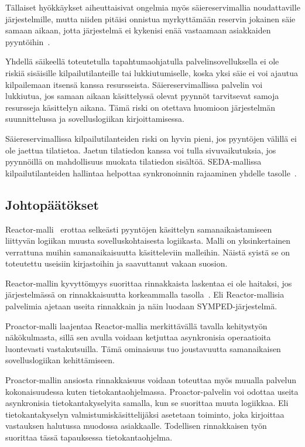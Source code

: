 \documentclass[finnish]{tktltiki2}%
\theoremstyle{definition}
\theoremstyle{remark}
\begin{document}
Tällaiset hyökkäykset aiheuttaisivat ongelmia myös säiereservimallia
noudattaville järjestelmille, mutta niiden pitäisi onnistua
myrkyttämään reservin jokainen säie samaan aikaan, jotta
järjestelmä ei kykenisi enää vastaamaan asiakkaiden pyyntöihin~\cite{davis_case_2017}.

Yhdellä säikeellä toteutetulla tapahtumaohjatulla palvelinsovelluksella ei ole
riskiä sisäisille kilpailutilanteille tai lukkiutumiselle, koska
yksi säie ei voi ajautua kilpailemaan itsensä kanssa resursseista.
Säiereservimallissa palvelin voi lukkiutua, jos samaan aikaan käsittelyssä olevat
pyynnöt tarvitsevat samoja resursseja käsittelyn aikana. Tämä riski on otettava
huomioon järjestelmän suunnittelussa ja sovelluslogiikan kirjoittamisessa.

Säiereservimallissa kilpailutilanteiden riski on hyvin pieni, jos pyyntöjen
välillä ei ole jaettua tilatietoa. Jaetun tilatiedon kanssa voi tulla
sivuvaikutuksia, jos pyynnöillä on mahdollisuus muokata tilatiedon sisältöä.
SEDA-mallissa kilpailutilanteiden hallintaa helpottaa synkronoinnin
rajaaminen yhdelle tasolle~\cite{welsh_seda_2001}.

\subsection{Johtopäätökset}
Reactor-malli~\cite{schmidt_reactor:_1995} erottaa
selkeästi pyyntöjen käsittelyn
samanaikaistamiseen liittyvän
logiikan muusta sovelluskohtaisesta logiikasta.
Malli on yksinkertainen verrattuna muihin samanaikaisuutta
käsitteleviin malleihin.
Näistä syistä se on toteutettu useisiin
kirjastoihin ja saavuttanut vakaan suosion.

Reactor-mallin kyvyttömyys suorittaa rinnakkaista laskentaa 
ei ole haitaksi, jos järjestelmässä on rinnakkaisuutta
korkeammalla tasolla~\cite{schmidt_reactor:_1995}. Eli
Reactor-mallisia palvelimia ajetaan useita rinnakkain
ja näin luodaan SYMPED-järjestelmä.

Proactor-malli laajentaa Reactor-mallia merkittävällä tavalla
kehitystyön näkökulmasta,
sillä sen avulla voidaan ketjuttaa asynkronisia
operaatioita luontevasti vastakutsuilla. Tämä ominaisuus
tuo joustavuutta samanaikaisen sovelluslogiikan kehittämiseen.

Proactor-mallin ansiosta rinnakkaisuus
voidaan toteuttaa myös 
muualla palvelun kokonaisuudessa kuten tietokantaohjelmassa.
Proactor-palvelin voi odottaa useita asynkronisia
tietokantakyselyita samalla, kun se suorittaa
muuta logiikkaa. Eli tietokantakyselyn valmistumiskäsittelijäksi
asetetaan toiminto, joka kirjoittaa vastauksen
halutussa muodossa asiakkaalle.
Todellisen rinnakkaisen työn
suorittaa tässä tapauksessa tietokantaohjelma.
\end{document}

